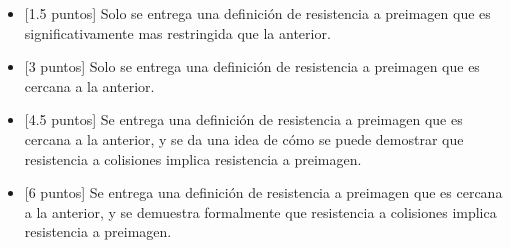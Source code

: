 \begin{itemize}
    \item{[1.5 puntos]} Solo se entrega una definición de resistencia a preimagen que es significativamente mas restringida que la anterior.
    
    \item{[3 puntos]} Solo se entrega una definición de resistencia a preimagen que es cercana a la anterior.
    
    \item{[4.5 puntos]} Se entrega una definición de resistencia a preimagen que es cercana a la anterior, y se da una idea de cómo se puede demostrar que resistencia a colisiones implica resistencia a preimagen.

    \item{[6 puntos]} Se entrega una definición de resistencia a preimagen que es cercana a la anterior, y se demuestra formalmente que resistencia a colisiones implica resistencia a preimagen.
\end{itemize}

\medskip
